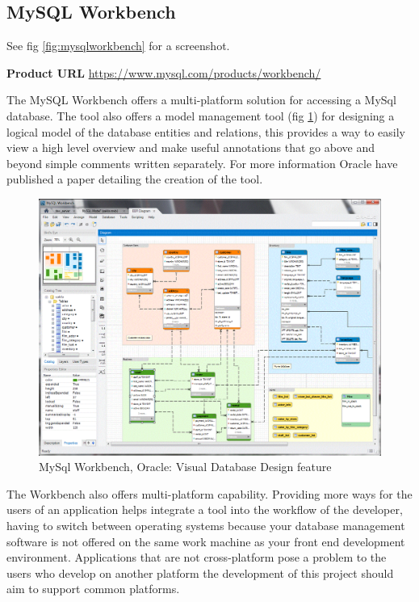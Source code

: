 \subsection{MySQL Workbench}\label{mysql-workbench}

\noindent
See fig \ref{fig:mysqlworkbench} for a screenshot.

\noindent
\textbf{Product URL}\cite{mysqlworkbench}
\url{https://www.mysql.com/products/workbench/}


The MySQL Workbench offers a multi-platform solution for accessing a
MySql database. The tool also offers a model management tool (fig \ref{fig:mysqlworkbenchmodel}) for designing
a logical model of the database entities and relations, this provides a way to
easily view a high level overview and make useful annotations that go
above and beyond simple comments written separately. For more information Oracle have published a paper detailing the creation of the tool\cite{mysqlworkbenchmodeldesign}.

\begin{figure}
  \includegraphics[width=\linewidth]{Figures/MySqlWorkbenchModel.png}
  \caption{MySql Workbench, Oracle: Visual Database Design feature}
  \label{fig:mysqlworkbenchmodel}
\end{figure}

The Workbench also offers multi-platform capability. Providing more ways for the
users of an application helps integrate a tool into the workflow of the
developer, having to switch between operating systems because your database
management software is not offered on the same work machine as your front end
development environment. Applications that are not cross-platform pose a problem to the users who develop on another platform the development of this project should aim to support common platforms.


